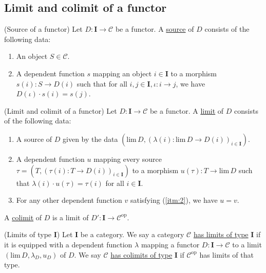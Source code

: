 
\subsection{Limit and colimit of a functor}

\begin{definition}{(Source of a functor)}
Let $D : \mathbf{I} \rightarrow \mathcal{C}$ be a functor. A \ul{source} of $D$ consists of the following data:
\begin{enumerate}
\renewcommand{\labelenumi}{(\theenumi)}
\item An object $S \in \mathcal{C}$.
\item A dependent function $s$ mapping an object $i \in \mathbf{I}$ to a morphism
$s(i) : S \rightarrow D(i)$ such that for all $i, j \in \mathbf{I}, \iota : i \rightarrow j$, we have $D(\iota) \cdot s(i) = s(j)$.
\end{enumerate}
\end{definition}

\begin{definition}{(Limit and colimit of a functor)}
Let $D : \mathbf{I} \rightarrow \mathcal{C}$ be a functor. A \ul{limit} of $D$ consists of the
following data:
\begin{enumerate}
\renewcommand{\labelenumi}{(\theenumi)}
\item A source of $D$ given by the data $(\mathrm{lim}\, D, (\lambda(i) : \mathrm{lim}\, D \rightarrow D(i))_{i\in\mathbf{I}})$.
\item A dependent function $u$ mapping every source $\tau = (T, (\tau(i) : T \rightarrow D(i))_{i \in \mathbf{I}})$ to a
morphism $u(\tau) : T \rightarrow \mathrm{lim}\, D$ such that $\lambda(i) \cdot u(\tau) = \tau(i)$ for all $i \in \mathbf{I}$.\label{itm:2}
\item For any other dependent function $v$ satisfying (\ref{itm:2}), we have $u = v$.
\end{enumerate}
A \ul{colimit} of $D$ is a limit of $D' : \mathbf{I} \rightarrow \mathcal{C}^{\mathrm{op}}$.
\end{definition}

\begin{definition}{(Limits of type \textbf{I})}
Let $\mathbf{I}$ be a category. We say a category $\mathcal{C}$ \ul{has limits of type} $\mathbf{I}$ if it is
equipped with a dependent function $\lambda$ mapping a functor $D : \mathbf{I} \rightarrow \mathcal{C}$ to a limit
$(\mathrm{lim}\, D, \lambda_{D}, u_{D})$ of $D$.
We say $\mathcal{C}$ \ul{has colimits of type} $\mathbf{I}$ if $\mathcal{C}^{\mathrm{op}}$ has limits of that type.
\end{definition}

